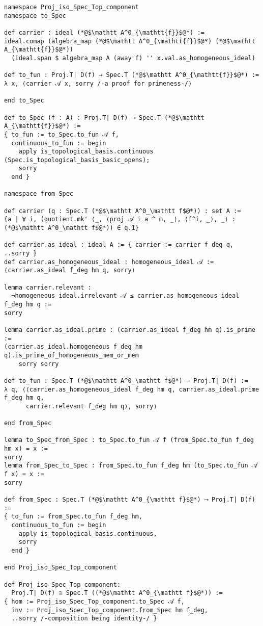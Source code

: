 \documentclass[a4paper,UKenglish,cleveref, autoref, thm-restate]{lipics-v2021}
\begin{document}
\begin{lstlisting}
namespace Proj_iso_Spec_Top_component
namespace to_Spec

def carrier : ideal (*@$\mathtt A^0_{\mathtt{f}}$@*) :=
ideal.comap (algebra_map (*@$\mathtt A^0_{\mathtt{f}}$@*) (*@$\mathtt A_{\mathtt{f}}$@*))
  (ideal.span $ algebra_map A (away f) '' x.val.as_homogeneous_ideal)

def to_fun : Proj.T| D(f) → Spec.T (*@$\mathtt A^0_{\mathtt{f}}$@*) :=
λ x, ⟨carrier 𝒜 x, sorry /-a proof for primeness-/⟩

end to_Spec

def to_Spec (f : A) : Proj.T| D(f) ⟶ Spec.T (*@$\mathtt A_{\mathtt{f}}$@*) :=
{ to_fun := to_Spec.to_fun 𝒜 f,
  continuous_to_fun := begin
    apply is_topological_basis.continuous (Spec.is_topological_basis_basic_opens);
    sorry
  end }

namespace from_Spec

def carrier (q : Spec.T (*@$\mathtt A^0_\mathtt f$@*)) : set A :=
{a | ∀ i, (quotient.mk' ⟨_, ⟨proj 𝒜 i a ^ m, _⟩, ⟨f^i, _⟩, _⟩ : (*@$\mathtt A^0_\mathtt f$@*)) ∈ q.1}

def carrier.as_ideal : ideal A := { carrier := carrier f_deg q, ..sorry }
def carrier.as_homogeneous_ideal : homogeneous_ideal 𝒜 := 
⟨carrier.as_ideal f_deg hm q, sorry⟩

lemma carrier.relevant :
  ¬homogeneous_ideal.irrelevant 𝒜 ≤ carrier.as_homogeneous_ideal f_deg hm q := 
sorry

lemma carrier.as_ideal.prime : (carrier.as_ideal f_deg hm q).is_prime :=
(carrier.as_ideal.homogeneous f_deg hm q).is_prime_of_homogeneous_mem_or_mem 
    sorry sorry

def to_fun : Spec.T (*@$\mathtt A^0_\mathtt f$@*) → Proj.T| D(f) :=
λ q, ⟨⟨carrier.as_homogeneous_ideal f_deg hm q, carrier.as_ideal.prime f_deg hm q,
      carrier.relevant f_deg hm q⟩, sorry⟩

end from_Spec

lemma to_Spec_from_Spec : to_Spec.to_fun 𝒜 f (from_Spec.to_fun f_deg hm x) = x := 
sorry
lemma from_Spec_to_Spec : from_Spec.to_fun f_deg hm (to_Spec.to_fun 𝒜 f x) = x :=
sorry

def from_Spec : Spec.T (*@$\mathtt A^0_{\mathtt f}$@*) ⟶ Proj.T| D(f) :=
{ to_fun := from_Spec.to_fun f_deg hm,
  continuous_to_fun := begin
    apply is_topological_basis.continuous,
    sorry
  end }

end Proj_iso_Spec_Top_component

def Proj_iso_Spec_Top_component:
  Proj.T| D(f) ≅ Spec.T ((*@$\mathtt A^0_{\mathtt f}$@*)) :=
{ hom := Proj_iso_Spec_Top_component.to_Spec 𝒜 f,
  inv := Proj_iso_Spec_Top_component.from_Spec hm f_deg, 
  ..sorry /-composition being identity-/ }
\end{lstlisting}
\end{document}
